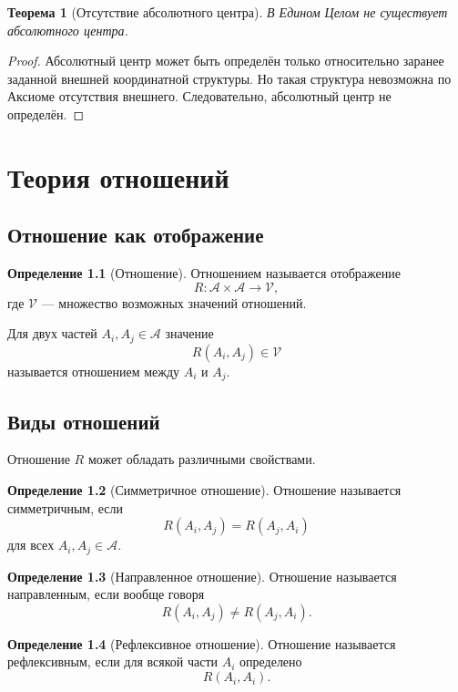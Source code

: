 \documentclass[12pt,a4paper,oneside]{book}
\theoremstyle{definition}
\newtheorem{definition}{Определение}[chapter]
\theoremstyle{plain}
\newtheorem{theorem}{Теорема}[chapter]
\theoremstyle{remark}
\newcommand{\Parts}{\mathcal A}
\newcommand{\Rel}{R}
\newcommand{\Values}{\mathcal V}
\begin{document}
\begin{theorem}[Отсутствие абсолютного центра]
В Едином Целом не существует абсолютного центра.
\end{theorem}

\begin{proof}
Абсолютный центр может быть определён только относительно заранее заданной внешней координатной структуры. Но такая структура невозможна по Аксиоме отсутствия внешнего. Следовательно, абсолютный центр не определён.
\end{proof}

\chapter{Теория отношений}

\section{Отношение как отображение}

\begin{definition}[Отношение]
Отношением называется отображение
\[
\Rel:\Parts \times \Parts \to \Values,
\]
где \(\Values\) --- множество возможных значений отношений.
\end{definition}

Для двух частей \(A_i,A_j \in \Parts\) значение
\[
\Rel(A_i,A_j) \in \Values
\]
называется отношением между \(A_i\) и \(A_j\).

\section{Виды отношений}

Отношение \(\Rel\) может обладать различными свойствами.

\begin{definition}[Симметричное отношение]
Отношение называется симметричным, если
\[
\Rel(A_i,A_j)=\Rel(A_j,A_i)
\]
для всех \(A_i,A_j \in \Parts\).
\end{definition}

\begin{definition}[Направленное отношение]
Отношение называется направленным, если вообще говоря
\[
\Rel(A_i,A_j)\neq \Rel(A_j,A_i).
\]
\end{definition}

\begin{definition}[Рефлексивное отношение]
Отношение называется рефлексивным, если для всякой части \(A_i\) определено
\[
\Rel(A_i,A_i).
\]
\end{definition}
\end{document}
